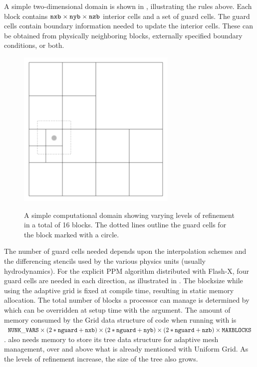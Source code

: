 A simple two-dimensional domain is shown in
, illustrating the rules above. Each
block contains ${\tt nxb}\times{\tt nyb}\times{\tt nzb}$ interior
cells and a set of guard cells. The guard cells contain boundary
information needed to update the interior cells. These can be obtained
from physically neighboring blocks, externally specified boundary
conditions, or both.
\begin{figure}
\begin{center}
{\leavevmode\includegraphics[width=3in]{Grid_block_structure}}
\end{center}
\caption{\label{Fig:block_structure.eps} A simple computational domain showing
varying levels of refinement in a total of 16 blocks.  The dotted lines outline the
guard cells for the block marked with a circle.}
\end{figure}
The number of guard cells needed depends upon the interpolation schemes
and the differencing stencils used by the various physics units (usually
hydrodynamics). For the explicit PPM algorithm distributed with Flash-X,
four guard cells are needed in each direction, as illustrated in
. The blocksize while using the adaptive
grid is fixed at compile time, resulting in static
memory%
allocation.  The total number of blocks a
processor can manage is determined by
which can be
overridden at setup time with the 
argument. The amount of memory consumed by the Grid data structure of
code when running with \Paramesh is ${\tt NUNK\_VARS} \times
(2*{\tt nguard}+{\tt nxb}) \times
(2*{\tt nguard}+{\tt nyb}) \times
(2*{\tt nguard}+{\tt nzb}) \times {\tt MAXBLOCKS}$. \Paramesh
also needs memory to store its tree data structure for adaptive mesh
management, over and above what is already mentioned with Uniform
Grid. As the levels of refinement increase, the size of the tree also
grows.


